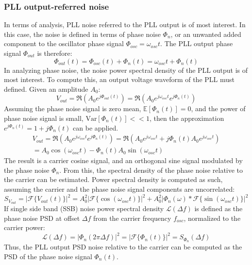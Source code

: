 \subsubsection{PLL output-referred noise}\label{pn_noise_psd}
In terms of analysis, PLL noise referred to the PLL output is of most interest. In this case, the noise is defined in terms of phase noise $\Phi_{n}$, or an unwanted added component to the oscillator phase signal $\Phi_{osc}=\omega_{osc}t$. The PLL output phase signal $\Phi_{out}$ is therefore:
\begin{equation}
	\Phi_{out}(t) = \Phi_{osc}(t) + \Phi_{n}(t) = \omega_{osc}t + \Phi_{n}(t) 
\end{equation}
In analyzing phase noise, the noise power spectral density of the PLL output is of most interest. To compute this, an output voltage waveform of the PLL must defined. Given an amplitude $A_0$:
\begin{equation}
V_{out} = \Re\left(A_0e^{j\Phi_{out}(t)}\right) = \Re\left(A_0e^{j\omega_{osc}t}e^{j\Phi_{n}(t)}\right)
\end{equation}
Assuming the phase noise signal is zero mean, $\mathbb{E}[\Phi_{n}(t)]=0$, and the power of phase noise signal is small, $\mathrm{Var}[\Phi_{n}(t)] << 1$, then the approximation $e^{j\Phi_{n}(t)} = 1 + j\Phi_{n}(t)$ can be applied.
\begin{align}
V_{out} = \Re\left(A_0e^{j\omega_{osc}t}e^{j\Phi_{n}(t)}\right) = \Re\left(A_0e^{j\omega_{osc}t} +j\Phi_{n}(t)A_0e^{j\omega_{osc}t}\right)\\
= A_0\cos(\omega_{osc}t) - \Phi_{n}(t)A_0\sin(\omega_{osc}t)
\end{align}
The result is a carrier cosine signal, and an orthogonal sine signal modulated by the phase noise $\Phi_{n}$. From this, the spectral density of the phase noise relative to the carrier can be estimated. Power spectral density is computed as such, assuming the carrier and the phase noise signal components are uncorrelated:
\begin{equation}
S_{V_{out}} = |\mathcal{F}\{V_{out}(t)\}|^2 = A_0^2|\mathcal{F}\{\cos(\omega_{osc}t)\}|^2 + A_0^2|\Phi_{n}(\omega)*\mathcal{F}\{\sin(\omega_{osc}t)\}|^2
\end{equation}
If single side band (SSB) noise power spectral density $\mathcal{L}(\Delta f)$ is defined as the phase noise PSD at offset $\Delta f$ from the carrier frequency $f_{osc}$, normalized to the carrier power:
\begin{equation}
\mathcal{L}(\Delta f) = |\Phi_{n}(2\pi\Delta f)|^2 = |\mathcal{F}\{\Phi_{n}(t)\}|^2= S_{\Phi_{n}}(\Delta f)
\end{equation}
Thus, the PLL output PSD noise relative to the carrier can be computed as the PSD of the phase noise signal $\Phi_{n}(t)$.

